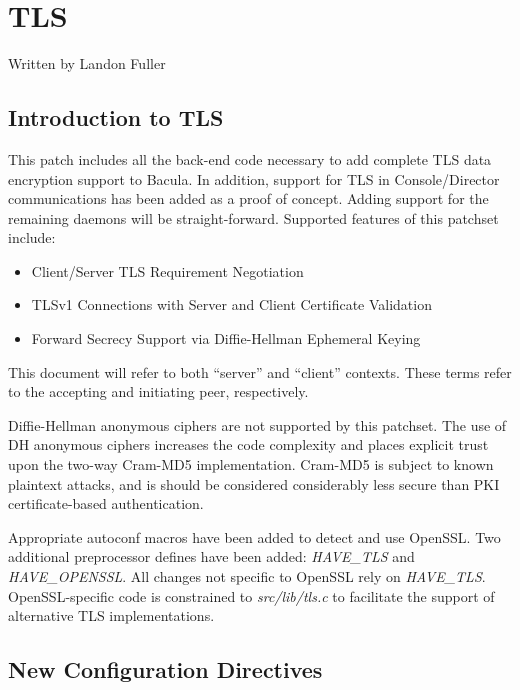 

\chapter{TLS}
\label{_Chapter_TLS}

Written by Landon Fuller

\section{Introduction to TLS}

This patch includes all the back-end code necessary to add complete TLS
data encryption support to Bacula.  In addition, support for TLS in
Console/Director communications has been added as a proof of concept.
Adding support for the remaining daemons will be straight-forward.
Supported features of this patchset include:

\begin{itemize} 
\item Client/Server TLS Requirement Negotiation 
\item TLSv1 Connections with Server and Client Certificate
Validation 
\item Forward Secrecy Support via Diffie-Hellman Ephemeral Keying 
\end{itemize}

This document will refer to both ``server'' and ``client'' contexts.  These
terms refer to the accepting and initiating peer, respectively.

Diffie-Hellman anonymous ciphers are not supported by this patchset.  The
use of DH anonymous ciphers increases the code complexity and places
explicit trust upon the two-way Cram-MD5 implementation.  Cram-MD5 is
subject to known plaintext attacks, and is should be considered
considerably less secure than PKI certificate-based authentication.

Appropriate autoconf macros have been added to detect and use OpenSSL. Two
additional preprocessor defines have been added: \emph{HAVE\_TLS} and
\emph{HAVE\_OPENSSL}.  All changes not specific to OpenSSL rely on
\emph{HAVE\_TLS}.  OpenSSL-specific code is constrained to
\emph{src/lib/tls.c} to facilitate the support of alternative TLS
implementations.

\section{New Configuration Directives}

